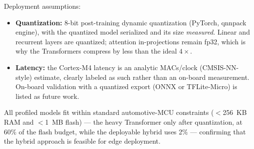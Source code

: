 \noindent
Deployment assumptions:
\begin{itemize}
    \item \textbf{Quantization:} 8-bit post-training dynamic quantization
    (PyTorch, qnnpack engine), with the quantized model serialized and its size
    \emph{measured}. Linear and recurrent layers are quantized; attention
    in-projections remain fp32, which is why the Transformers compress by less
    than the ideal $4\times$.
    \item \textbf{Latency:} the Cortex-M4 latency is an analytic MACs/clock
    (CMSIS-NN-style) estimate, clearly labeled as such rather than an on-board
    measurement. On-board validation with a quantized export (ONNX or
    TFLite-Micro) is listed as future work.
\end{itemize}

\noindent
All profiled models fit within standard automotive-MCU constraints
($<$256~KB RAM and $<$1~MB flash) --- the heavy Transformer only after
quantization, at 60\% of the flash budget, while the deployable hybrid uses
2\% --- confirming that the hybrid approach is feasible for edge deployment.
